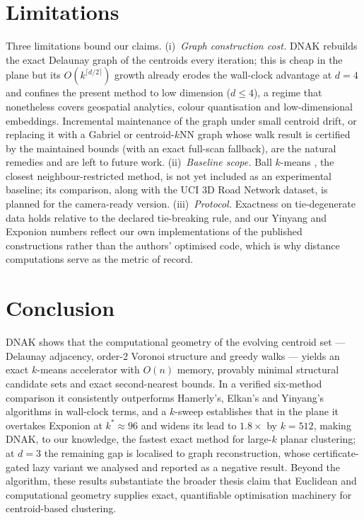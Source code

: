 \documentclass[review,12pt]{elsarticle}
\begin{document}
\section{Limitations}
\label{sec:limits}

Three limitations bound our claims. (i)~\emph{Graph construction
cost.} DNAK rebuilds the exact Delaunay graph of the centroids every
iteration; this is cheap in the plane but its
$O(k^{\lceil d/2\rceil})$ growth already erodes the wall-clock
advantage at $d{=}4$ and confines the present method to low dimension
($d\le 4$), a regime that nonetheless covers geospatial analytics,
colour quantisation and low-dimensional embeddings. Incremental
maintenance of the graph under small centroid drift, or replacing it
with a Gabriel or centroid-$k$NN graph whose walk result is certified
by the maintained bounds (with an exact full-scan fallback), are the
natural remedies and are left to future work. (ii)~\emph{Baseline
scope.} Ball $k$-means \cite{ballkmeans}, the closest
neighbour-restricted method, is not yet included as an experimental
baseline; its comparison, along with the UCI 3D Road Network dataset,
is planned for the camera-ready version. (iii)~\emph{Protocol.}
Exactness on tie-degenerate data holds relative to the declared
tie-breaking rule, and our Yinyang and Exponion numbers reflect our
own implementations of the published constructions rather than the
authors' optimised code, which is why distance computations serve as
the metric of record.

\section{Conclusion}
\label{sec:conc}

DNAK shows that the computational geometry of the evolving centroid
set --- Delaunay adjacency, order-2 Voronoi structure and greedy walks
--- yields an exact $k$-means accelerator with $O(n)$ memory, provably
minimal structural candidate sets and exact second-nearest bounds. In
a verified six-method comparison it consistently outperforms
Hamerly's, Elkan's and Yinyang's algorithms in wall-clock terms, and a
$k$-sweep establishes that in the plane it overtakes Exponion at
$k^\ast\approx 96$ and widens its lead to $1.8\times$ by $k{=}512$,
making DNAK, to our knowledge, the fastest exact method for large-$k$
planar clustering; at $d{=}3$ the remaining gap is localised to graph
reconstruction, whose certificate-gated lazy variant we analysed and
reported as a negative result. Beyond the algorithm, these results
substantiate the broader thesis claim that Euclidean and computational
geometry supplies exact, quantifiable optimisation machinery for
centroid-based clustering.
\end{document}
